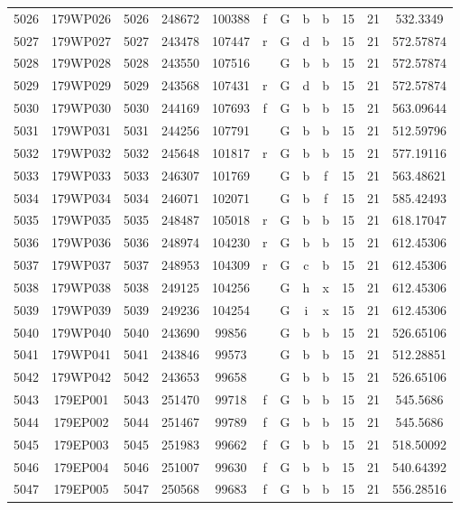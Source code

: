 \begin{tabular}{|*{12}{c|}}
5026 & 179WP026 & 5026 & 248672 & 100388 & f & G & b & b & 15 & 21 & 532.3349 \\ 
5027 & 179WP027 & 5027 & 243478 & 107447 & r & G & d & b & 15 & 21 & 572.57874 \\ 
5028 & 179WP028 & 5028 & 243550 & 107516 &  & G & b & b & 15 & 21 & 572.57874 \\ 
5029 & 179WP029 & 5029 & 243568 & 107431 & r & G & d & b & 15 & 21 & 572.57874 \\ 
5030 & 179WP030 & 5030 & 244169 & 107693 & f & G & b & b & 15 & 21 & 563.09644 \\ 
5031 & 179WP031 & 5031 & 244256 & 107791 &  & G & b & b & 15 & 21 & 512.59796 \\ 
5032 & 179WP032 & 5032 & 245648 & 101817 & r & G & b & b & 15 & 21 & 577.19116 \\ 
5033 & 179WP033 & 5033 & 246307 & 101769 &  & G & b & f & 15 & 21 & 563.48621 \\ 
5034 & 179WP034 & 5034 & 246071 & 102071 &  & G & b & f & 15 & 21 & 585.42493 \\ 
5035 & 179WP035 & 5035 & 248487 & 105018 & r & G & b & b & 15 & 21 & 618.17047 \\ 
5036 & 179WP036 & 5036 & 248974 & 104230 & r & G & b & b & 15 & 21 & 612.45306 \\ 
5037 & 179WP037 & 5037 & 248953 & 104309 & r & G & c & b & 15 & 21 & 612.45306 \\ 
5038 & 179WP038 & 5038 & 249125 & 104256 &  & G & h & x & 15 & 21 & 612.45306 \\ 
5039 & 179WP039 & 5039 & 249236 & 104254 &  & G & i & x & 15 & 21 & 612.45306 \\ 
5040 & 179WP040 & 5040 & 243690 & 99856 &  & G & b & b & 15 & 21 & 526.65106 \\ 
5041 & 179WP041 & 5041 & 243846 & 99573 &  & G & b & b & 15 & 21 & 512.28851 \\ 
5042 & 179WP042 & 5042 & 243653 & 99658 &  & G & b & b & 15 & 21 & 526.65106 \\ 
5043 & 179EP001 & 5043 & 251470 & 99718 & f & G & b & b & 15 & 21 & 545.5686 \\ 
5044 & 179EP002 & 5044 & 251467 & 99789 & f & G & b & b & 15 & 21 & 545.5686 \\ 
5045 & 179EP003 & 5045 & 251983 & 99662 & f & G & b & b & 15 & 21 & 518.50092 \\ 
5046 & 179EP004 & 5046 & 251007 & 99630 & f & G & b & b & 15 & 21 & 540.64392 \\ 
5047 & 179EP005 & 5047 & 250568 & 99683 & f & G & b & b & 15 & 21 & 556.28516 \\ 

\end{tabular}
